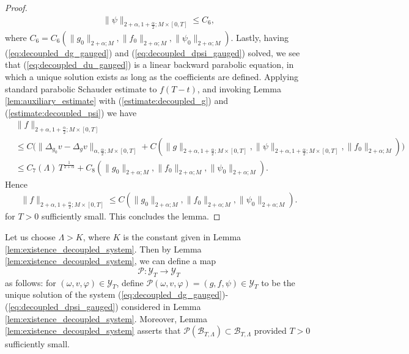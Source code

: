\documentclass{amsart}
\theoremstyle{definition}
\theoremstyle{remark}
\numberwithin{equation}{section}
\begin{document}
\begin{proof}
	\begin{equation}\label{estimate:decoupled_psi}
		\begin{aligned}
			\|\psi\|_{2+\alpha,1+\frac{\alpha}{2};M\times[0,T]} \leq C_6,
		\end{aligned}
	\end{equation}
	where $C_6 = C_6(\|g_0\|_{2+\alpha;M}, \|f_0\|_{2+\alpha;M},\|\psi_0\|_{2+\alpha;M})$. Lastly, having (\ref{eq:decoupled_dg_gauged}) and (\ref{eq:decoupled_dpsi_gauged}) solved, we see that (\ref{eq:decoupled_du_gauged}) is a linear backward parabolic equation, in which a unique solution exists as long as the coefficients are defined.  Applying standard parabolic Schauder estimate to $f(T-t)$, and invoking Lemma \ref{lem:auxiliary_estimate} with (\ref{estimate:decoupled_g}) and (\ref{estimate:decoupled_psi}) we have
	\begin{equation}
		\begin{aligned}
			&\|f\|_{2+\alpha,1+\frac{\alpha}{2};M\times[0,T]}
			\\[1ex]
			 &\leq C \Big( \|\Delta_{g_0} v - \Delta_g v \|_{\alpha,\frac{\alpha}{2};M\times[0,T]} + C(\|g\|_{2+\alpha,1+\frac{\alpha}{2};M\times[0,T]}, \|\psi\|_{2+\alpha,1+\frac{\alpha}{2};M\times[0,T]}, \|f_0\|_{2+\alpha;M}) \Big)\\[1ex]
			 &\leq C_7(\Lambda)\, T^{\frac{1}{2+\alpha}} + C_8 (\|g_0\|_{2+\alpha;M}, \|f_0\|_{2+\alpha;M},\|\psi_0\|_{2+\alpha;M}).
		\end{aligned}
	\end{equation}
Hence	
	\begin{equation}
		\begin{aligned}
			\|f\|_{2+\alpha,1+\frac{\alpha}{2};M\times[0,T]} \leq C(\|g_0\|_{2+\alpha;M}, \|f_0\|_{2+\alpha;M},\|\psi_0\|_{2+\alpha;M}).
		\end{aligned}
	\end{equation}
for $T>0$ sufficiently small. 	This concludes the lemma.
\end{proof}
	
	
\bigskip




  Let us choose $\Lambda > K$, where $K$ is the constant given in Lemma \ref{lem:existence_decoupled_system}. Then by Lemma \ref{lem:existence_decoupled_system}, we can define a map
	\[	\mathcal{P}: \mathcal{Y}_T \to\mathcal{Y}_T\]
	as follows: for $(\omega, v,\varphi)\in \mathcal{Y}_T$, define $\mathcal{P}(\omega, v,\varphi) = (g,f,\psi)\in \mathcal{Y}_T$ to be the unique solution of the system (\ref{eq:decoupled_dg_gauged})-(\ref{eq:decoupled_dpsi_gauged}) considered in Lemma \ref{lem:existence_decoupled_system}. Moreover, Lemma \ref{lem:existence_decoupled_system} asserts that $\mathcal{P}(\mathcal{B}_{T,\Lambda}) \subset \mathcal{B}_{T,\Lambda}$ provided $T>0$ sufficiently small.
		
\end{document}
